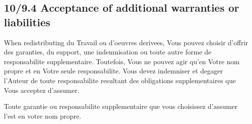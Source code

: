 \documentclass[a4paper,11pt]{article}
\begin{document}
\subsection*{10/9.4 Acceptance of additional warranties or liabilities}

When redistributing du Travail ou d'oeuvres derivees, Vous pouvez
choisir d'offrir des garanties, du support, une indemnisation ou toute
autre forme de responsabilite supplementaire. Toutefois, Vous ne pouvez
agir qu'en Votre nom propre et en Votre seule responsabilite. Vous devez
indemniser et degager l'Auteur de toute responsabilite resultant des
obligations supplementaires que Vous acceptez d'assumer.

Toute garantie ou responsabilite supplementaire que vous choisissez
d'assumer l'est en votre nom propre.
\end{document}
